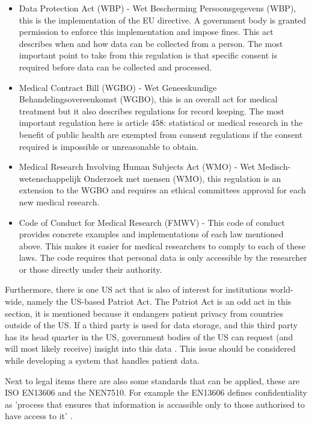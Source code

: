 \begin{itemize}
	\item Data Protection Act (WBP) - Wet Bescherming Persoonsgegevens (WBP), this is the implementation of the EU directive.
	A government body is granted permission to enforce this implementation and impose fines.
	This act describes when and how data can be collected from a person.
	The most important point to take from this regulation is that specific consent is required before data can be collected and processed.
	\item Medical Contract Bill (WGBO) - Wet Geneeskundige Behandelingsovereenkomst (WGBO), this is an overall act for medical treatment but it also describes regulations for record keeping.
	The most important regulation here is article 458: statistical or medical research in the benefit of public health are exempted from consent regulations if the consent required is impossible or unreasonable to obtain.
	\item Medical Research Involving Human Subjects Act (WMO) - Wet Medisch-wetenschappelijk Onderzoek met mensen (WMO), this regulation is an extension to the WGBO and requires an ethical committees approval for each new medical research.
	\item Code of Conduct for Medical Research (FMWV) - This code of conduct provides concrete examples and implementations of each law mentioned above.
	This makes it easier for medical researchers to comply to each of these laws.
	The code requires that personal data is only accessible by the researcher or those directly under their authority.
\end{itemize}

Furthermore, there is one US act that is also of interest for institutions world-wide, namely the US-based Patriot Act.
The Patriot Act is an odd act in this section, it is mentioned because it endangers patient privacy from countries outside of the US.
If a third party is used for data storage, and this third party has its head quarter in the US, government bodies of the US can request (and will most likely receive) insight into this data \cite{s7Kluge2007}.
This issue should be considered while developing a system that handles patient data.

Next to legal items there are also some standards that can be applied, these are ISO EN13606 and the NEN7510.
For example the EN13606 defines confidentiality as 'process that ensures that information is accassible only to those authorised to have access to it' \cite{s8FernandezAleman2013}.

